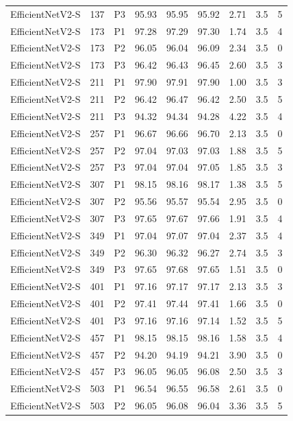 {\begin{longtable}{lrlrrrrrr}
EfficientNetV2-S & 137 & P3 & 95.93 & 95.95 & 95.92 & 2.71 & 3.5 & 5 \\
EfficientNetV2-S & 173 & P1 & 97.28 & 97.29 & 97.30 & 1.74 & 3.5 & 4 \\
EfficientNetV2-S & 173 & P2 & 96.05 & 96.04 & 96.09 & 2.34 & 3.5 & 0 \\
EfficientNetV2-S & 173 & P3 & 96.42 & 96.43 & 96.45 & 2.60 & 3.5 & 3 \\
EfficientNetV2-S & 211 & P1 & 97.90 & 97.91 & 97.90 & 1.00 & 3.5 & 3 \\
EfficientNetV2-S & 211 & P2 & 96.42 & 96.47 & 96.42 & 2.50 & 3.5 & 5 \\
EfficientNetV2-S & 211 & P3 & 94.32 & 94.34 & 94.28 & 4.22 & 3.5 & 4 \\
EfficientNetV2-S & 257 & P1 & 96.67 & 96.66 & 96.70 & 2.13 & 3.5 & 0 \\
EfficientNetV2-S & 257 & P2 & 97.04 & 97.03 & 97.03 & 1.88 & 3.5 & 5 \\
EfficientNetV2-S & 257 & P3 & 97.04 & 97.04 & 97.05 & 1.85 & 3.5 & 3 \\
EfficientNetV2-S & 307 & P1 & 98.15 & 98.16 & 98.17 & 1.38 & 3.5 & 5 \\
EfficientNetV2-S & 307 & P2 & 95.56 & 95.57 & 95.54 & 2.95 & 3.5 & 0 \\
EfficientNetV2-S & 307 & P3 & 97.65 & 97.67 & 97.66 & 1.91 & 3.5 & 4 \\
EfficientNetV2-S & 349 & P1 & 97.04 & 97.07 & 97.04 & 2.37 & 3.5 & 4 \\
EfficientNetV2-S & 349 & P2 & 96.30 & 96.32 & 96.27 & 2.74 & 3.5 & 3 \\
EfficientNetV2-S & 349 & P3 & 97.65 & 97.68 & 97.65 & 1.51 & 3.5 & 0 \\
EfficientNetV2-S & 401 & P1 & 97.16 & 97.17 & 97.17 & 2.13 & 3.5 & 3 \\
EfficientNetV2-S & 401 & P2 & 97.41 & 97.44 & 97.41 & 1.66 & 3.5 & 0 \\
EfficientNetV2-S & 401 & P3 & 97.16 & 97.16 & 97.14 & 1.52 & 3.5 & 5 \\
EfficientNetV2-S & 457 & P1 & 98.15 & 98.15 & 98.16 & 1.58 & 3.5 & 4 \\
EfficientNetV2-S & 457 & P2 & 94.20 & 94.19 & 94.21 & 3.90 & 3.5 & 0 \\
EfficientNetV2-S & 457 & P3 & 96.05 & 96.05 & 96.08 & 2.50 & 3.5 & 3 \\
EfficientNetV2-S & 503 & P1 & 96.54 & 96.55 & 96.58 & 2.61 & 3.5 & 0 \\
EfficientNetV2-S & 503 & P2 & 96.05 & 96.08 & 96.04 & 3.36 & 3.5 & 5 \\

\end{longtable}}
